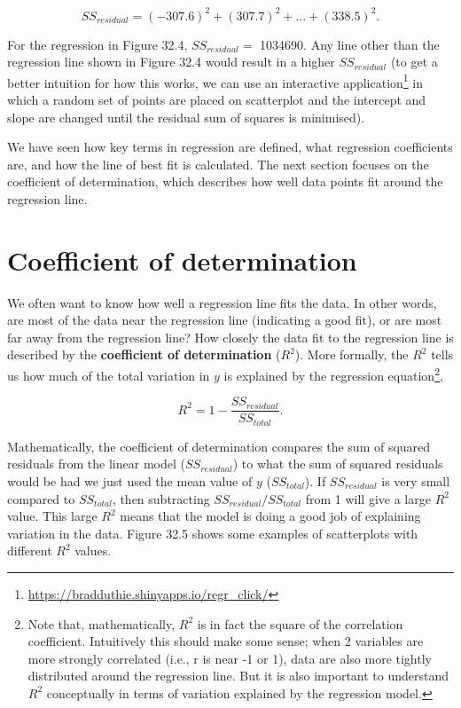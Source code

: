 \documentclass[
]{scrbook}
\begin{document}
\[SS_{residual} = (-307.6)^{2} + (307.7)^2 + ... + (338.5)^{2}.\]

For the regression in Figure 32.4, \(SS_{residual} =\) 1034690.
Any line other than the regression line shown in Figure 32.4 would result in a higher \(SS_{residual}\) (to get a better intuition for how this works, we can use an interactive application\footnote{\url{https://bradduthie.shinyapps.io/regr_click/}} in which a random set of points are placed on scatterplot and the intercept and slope are changed until the residual sum of squares is minimised).

We have seen how key terms in regression are defined, what regression coefficients are, and how the line of best fit is calculated.
The next section focuses on the coefficient of determination, which describes how well data points fit around the regression line.

\hypertarget{coefficient-of-determination}{%
\section{Coefficient of determination}\label{coefficient-of-determination}}

We often want to know how well a regression line fits the data.
In other words, are most of the data near the regression line (indicating a good fit), or are most far away from the regression line?
How closely the data fit to the regression line is described by the \textbf{coefficient of determination} (\(R^{2}\)).
More formally, the \(R^{2}\) tells us how much of the total variation in \(y\) is explained by the regression equation\footnote{Note that, mathematically, \(R^{2}\) is in fact the square of the correlation coefficient. Intuitively this should make some sense; when 2 variables are more strongly correlated (i.e., r is near -1 or 1), data are also more tightly distributed around the regression line. But it is also important to understand \(R^{2}\) conceptually in terms of variation explained by the regression model.},

\[R^{2} = 1 - \frac{SS_{residual}}{SS_{total}}.\]

Mathematically, the coefficient of determination compares the sum of squared residuals from the linear model (\(SS_{residual}\)) to what the sum of squared residuals would be had we just used the mean value of \(y\) (\(SS_{total}\)).
If \(SS_{residual}\) is very small compared to \(SS_{total}\), then subtracting \(SS_{residual}/SS_{total}\) from 1 will give a large \(R^{2}\) value.
This large \(R^{2}\) means that the model is doing a good job of explaining variation in the data.
Figure 32.5 shows some examples of scatterplots with different \(R^{2}\) values.
\end{document}
